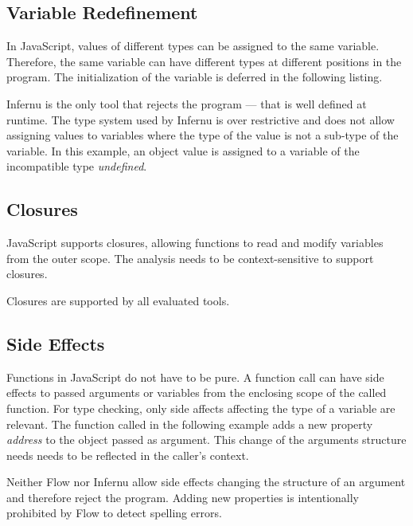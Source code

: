 \subsection{Variable Redefinement}\label{ssec:variable-redefinement}
In JavaScript, values of different types can be assigned to the same variable. Therefore, the same variable can have different types at different positions in the program. The initialization of the variable is deferred in the following listing.


Infernu is the only tool that rejects the program --- that is well defined at runtime. The type system used by Infernu is over restrictive and does not allow assigning values to variables where the type of the value is not a sub-type of the variable. In this example, an object value is assigned to a variable of the incompatible type \textit{undefined}.

\subsection{Closures}\label{ssec:closures}
JavaScript supports closures, allowing functions to read and modify variables from the outer scope. The analysis needs to be context-sensitive to support closures. 


Closures are supported by all evaluated tools.

\subsection{Side Effects}\label{ssec:side-effects}
Functions in JavaScript do not have to be pure. A function call can have side effects to passed arguments or variables from the enclosing scope of the called function. For type checking, only side affects affecting the type of a variable are relevant. The function called in the following example adds a new property \textit{address} to the object passed as argument. This change of the arguments structure needs needs to be reflected in the caller's context.


Neither Flow nor Infernu allow side effects changing the structure of an argument and therefore reject the program. Adding new properties is intentionally prohibited by Flow to detect spelling errors.

